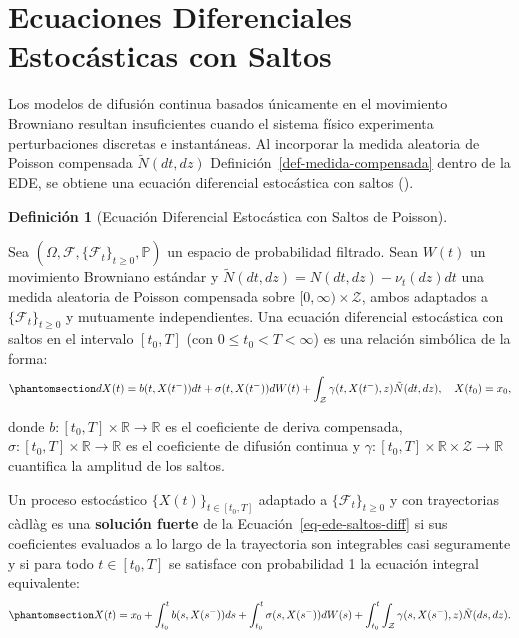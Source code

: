 \documentclass[
  spanish,
  us-letterpaper,
]{scrreprt}
\numberwithin{equation}{section}
\theoremstyle{plain}
\theoremstyle{plain}
\theoremstyle{definition}
\newtheorem{definition}{Definición}[chapter]
\theoremstyle{plain}
\theoremstyle{remark}
\begin{document}
\section{Ecuaciones Diferenciales Estocásticas con
Saltos}\label{ecuaciones-diferenciales-estocuxe1sticas-con-saltos}

Los modelos de difusión continua basados únicamente en el movimiento
Browniano resultan insuficientes cuando el sistema físico experimenta
perturbaciones discretas e instantáneas. Al incorporar la medida
aleatoria de Poisson compensada \(\tilde{N}(dt, dz)\)
Definición~\ref{def-medida-compensada} dentro de la EDE, se obtiene una
ecuación diferencial estocástica con saltos
().

\begin{definition}[Ecuación Diferencial Estocástica con Saltos de
Poisson]\protect\hypertarget{def-ede-saltos}{}\label{def-ede-saltos}

Sea \((\Omega, \mathcal{F}, \{\mathcal{F}_t\}_{t \ge 0}, \mathbb{P})\)
un espacio de probabilidad filtrado. Sean \(W(t)\) un movimiento
Browniano estándar y \(\tilde{N}(dt, dz) = N(dt, dz) - \nu_t(dz)dt\) una
medida aleatoria de Poisson compensada sobre
\([0, \infty) \times \mathcal{Z}\), ambos adaptados a
\(\{\mathcal{F}_t\}_{t \ge 0}\) y mutuamente independientes. Una
ecuación diferencial estocástica con saltos en el intervalo \([t_0, T]\)
(con \(0 \leq t_0 < T < \infty\)) es una relación simbólica de la forma:
\begin{equation}\phantomsection\label{eq-ede-saltos-diff}{
dX(t) = b(t, X(t^-)) dt + \sigma(t, X(t^-)) dW(t) + \int_{\mathcal{Z}} \gamma(t, X(t^-), z) \tilde{N}(dt, dz), \quad X(t_0) = x_0,
}\end{equation}

donde \(b: [t_0, T] \times \mathbb{R} \to \mathbb{R}\) es el coeficiente
de deriva compensada,
\(\sigma: [t_0, T] \times \mathbb{R} \to \mathbb{R}\) es el coeficiente
de difusión continua y
\(\gamma: [t_0, T] \times \mathbb{R} \times \mathcal{Z} \to \mathbb{R}\)
cuantifica la amplitud de los saltos.

Un proceso estocástico \(\{X(t)\}_{t \in [t_0, T]}\) adaptado a
\(\{\mathcal{F}_t\}_{t \ge 0}\) y con trayectorias càdlàg es una
\textbf{solución fuerte} de la Ecuación~\ref{eq-ede-saltos-diff} si sus
coeficientes evaluados a lo largo de la trayectoria son integrables casi
seguramente y si para todo \(t \in [t_0, T]\) se satisface con
probabilidad 1 la ecuación integral equivalente:
\begin{equation}\phantomsection\label{eq-ede-saltos-int}{
X(t) = x_0 + \int_{t_0}^t b(s, X(s^-)) ds + \int_{t_0}^t \sigma(s, X(s^-)) dW(s) + \int_{t_0}^t \int_{\mathcal{Z}} \gamma(s, X(s^-), z) \tilde{N}(ds, dz).
}\end{equation}

\end{definition}
\end{document}
